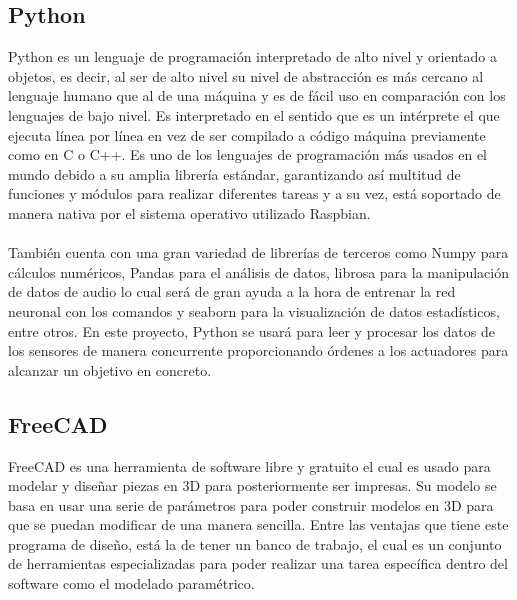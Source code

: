 \subsection{Python}
\label{subsec:python}

Python es un lenguaje de programación interpretado de alto nivel y orientado a objetos, es decir, al ser de alto nivel su nivel de abstracción es más cercano al lenguaje humano que al de una máquina y es de fácil uso en comparación con los lenguajes de bajo nivel. Es interpretado en el sentido que es un intérprete el que ejecuta línea por línea en vez de ser compilado a código máquina previamente como en C o C++. Es uno de los lenguajes de programación más usados en el mundo debido a su amplia librería estándar, garantizando así multitud de funciones y módulos para realizar diferentes tareas y a su vez, está soportado de manera nativa por el sistema operativo utilizado Raspbian.\\ \\ También cuenta con una gran variedad de librerías de terceros como Numpy para cálculos numéricos, Pandas para el análisis de datos, librosa para la manipulación de datos de audio lo cual será de gran ayuda a la hora de entrenar la red neuronal con los comandos y seaborn para la visualización de datos estadísticos, entre otros. En este proyecto, Python se usará para leer y procesar los datos de los sensores de manera concurrente proporcionando órdenes a los actuadores para alcanzar un objetivo en concreto.



\subsection{FreeCAD}
\label{subsec:freecad}


FreeCAD es una herramienta de software libre y gratuito el cual es usado para modelar y diseñar piezas en 3D para posteriormente ser impresas. Su modelo se basa en usar una serie de parámetros para poder construir modelos en 3D para que se puedan modificar de una manera sencilla. Entre las ventajas que tiene este programa de diseño, está la de tener un banco de trabajo, el cual es un conjunto de herramientas especializadas para poder realizar una tarea específica dentro del software como el modelado paramétrico. 


